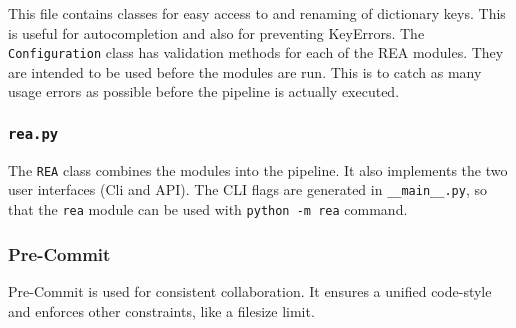\documentclass[
]{article}
\begin{document}
This file contains classes for easy access to and renaming of dictionary
keys. This is useful for autocompletion and also for preventing
KeyErrors. The \texttt{Configuration} class has validation methods for
each of the REA modules. They are intended to be used before the modules
are run. This is to catch as many usage errors as possible before the
pipeline is actually executed.

\hypertarget{rea.py}{%
\subsubsection{\texorpdfstring{\texttt{rea.py}}{rea.py}}\label{rea.py}}

The \texttt{REA} class combines the modules into the pipeline. It also
implements the two user interfaces (Cli and API). The CLI flags are
generated in \texttt{\_\_main\_\_.py}, so that the \texttt{rea} module
can be used with \texttt{python\ -m\ rea} command.

\hypertarget{pre-commit}{%
\subsubsection{Pre-Commit}\label{pre-commit}}

Pre-Commit is used for consistent collaboration. It ensures a unified
code-style and enforces other constraints, like a filesize limit.
\end{document}
